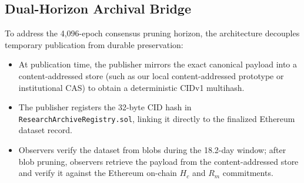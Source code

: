 \subsection{Dual-Horizon Archival Bridge}
To address the 4,096-epoch consensus pruning horizon, the architecture decouples temporary publication from durable preservation:
\begin{itemize}
    \item At publication time, the publisher mirrors the exact canonical payload into a content-addressed store (such as our local content-addressed prototype or institutional CAS) to obtain a deterministic CIDv1 multihash.
    \item The publisher registers the 32-byte CID hash in \texttt{ResearchArchiveRegistry.sol}, linking it directly to the finalized Ethereum dataset record.
    \item Observers verify the dataset from blobs during the 18.2-day window; after blob pruning, observers retrieve the payload from the content-addressed store and verify it against the Ethereum on-chain $H_c$ and $R_m$ commitments.
\end{itemize}

